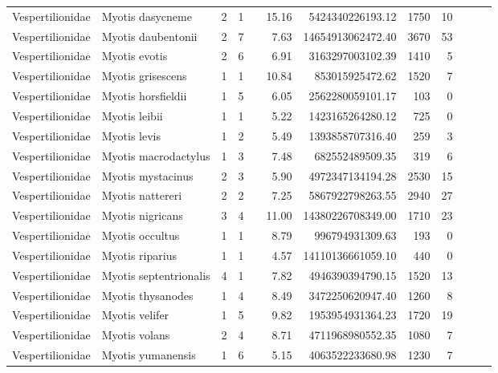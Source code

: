 \begin{landscape}
\begin{longtable}{@{}llrrrrrrrrrr@{}}
  Vespertilionidae & Myotis dasycneme &   2 &   1 &  & 15.16 & 5424340226193.12 & 1750 &  10 &  &  &  \\ 
  Vespertilionidae & Myotis daubentonii &   2 &   7 &  & 7.63 & 14654913062472.40 & 3670 &  53 &  &  &  \\ 
  Vespertilionidae & Myotis evotis &   2 &   6 &  & 6.91 & 3163297003102.39 & 1410 &   5 &  &  &  \\ 
  Vespertilionidae & Myotis grisescens &   1 &   1 &  & 10.84 & 853015925472.62 & 1520 &   7 &  &  &  \\ 
  Vespertilionidae & Myotis horsfieldii &   1 &   5 &  & 6.05 & 2562280059101.17 & 103 &   0 &  &  &  \\ 
  Vespertilionidae & Myotis leibii &   1 &   1 &  & 5.22 & 1423165264280.12 & 725 &   0 &  &  &  \\ 
  Vespertilionidae & Myotis levis &   1 &   2 &  & 5.49 & 1393858707316.40 & 259 &   3 &  &  &  \\ 
  Vespertilionidae & Myotis macrodactylus &   1 &   3 &  & 7.48 & 682552489509.35 & 319 &   6 &  &  &  \\ 
  Vespertilionidae & Myotis mystacinus &   2 &   3 &  & 5.90 & 4972347134194.28 & 2530 &  15 &  &  &  \\ 
  Vespertilionidae & Myotis nattereri &   2 &   2 &  & 7.25 & 5867922798263.55 & 2940 &  27 &  &  &  \\ 
  Vespertilionidae & Myotis nigricans &   3 &   4 &  & 11.00 & 14380226708349.00 & 1710 &  23 &  &  &  \\ 
  Vespertilionidae & Myotis occultus &   1 &   1 &  & 8.79 & 996794931309.63 & 193 &   0 &  &  &  \\ 
  Vespertilionidae & Myotis riparius &   1 &   1 &  & 4.57 & 14110136661059.10 & 440 &   0 &  &  &  \\ 
  Vespertilionidae & Myotis septentrionalis &   4 &   1 &  & 7.82 & 4946390394790.15 & 1520 &  13 &  &  &  \\ 
  Vespertilionidae & Myotis thysanodes &   1 &   4 &  & 8.49 & 3472250620947.40 & 1260 &   8 &  &  &  \\ 
  Vespertilionidae & Myotis velifer &   1 &   5 &  & 9.82 & 1953954931364.23 & 1720 &  19 &  &  &  \\ 
  Vespertilionidae & Myotis volans &   2 &   4 &  & 8.71 & 4711968980552.35 & 1080 &   7 &  &  &  \\ 
  Vespertilionidae & Myotis yumanensis &   1 &   6 &  & 5.15 & 4063522233680.98 & 1230 &   7 &  &  &  \\ 

\end{longtable}
\end{landscape}
